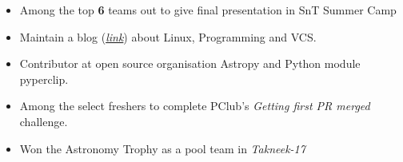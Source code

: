 
{\fontsize{11pt}{1em}\bodyfontlight\upshape\color{text}
\begin{itemize}
  \itemsep-0.3em
  \item Among the top \textbf{6} teams out to give final presentation in SnT Summer Camp
  \item Maintain a blog (\textit{\href{http://aniketpandey.com/homepage}{link}}) about Linux, Programming and VCS.
  \item Contributor at open source organisation Astropy and Python module pyperclip.
  \item Among the select freshers to complete PClub's \textit{Getting first PR merged} challenge.
  \item Won the Astronomy Trophy as a pool team in \textit{Takneek-17}
\end{itemize}
}

